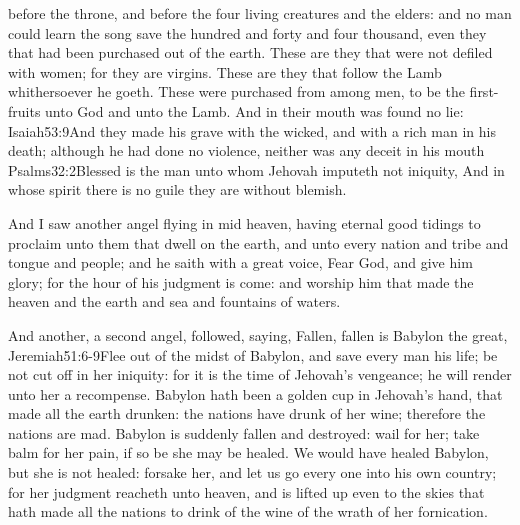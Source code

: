  before the throne, and before the four living creatures and the elders: and no man could learn the song save the hundred and forty and four thousand, even they that had been purchased out of the earth. 
 These are they that were not defiled with women; for they are virgins. These are they that follow the Lamb whithersoever he goeth. These were purchased from among men, to be the first-fruits unto God and unto the Lamb. 
 And in their mouth was found no lie:%
				   {Isaiah}{53:9}{And they made his grave with the wicked, and with a rich man in his death; although he had done no violence, neither was any deceit in his mouth}%
				   {Psalms}{32:2}{Blessed is the man unto whom Jehovah imputeth not iniquity,
And in whose spirit there is no guile}
 they are without blemish.

 And I saw another angel flying in mid heaven, having eternal good tidings to proclaim unto them that dwell on the earth, and unto every nation and tribe and tongue and people; 
 and he saith with a great voice, Fear God, and give him glory; for the hour of his judgment is come: and worship him that made the heaven and the earth and sea and fountains of waters.

 And another, a second angel, followed, saying, Fallen, fallen is Babylon the great,%
				  {Jeremiah}{51:6-9}{Flee out of the midst of Babylon, and save every man his life; be not cut off in her iniquity: for it is the time of Jehovah’s vengeance; he will render unto her a recompense. Babylon hath been a golden cup in Jehovah’s hand, that made all the earth drunken: the nations have drunk of her wine; therefore the nations are mad. Babylon is suddenly fallen and destroyed: wail for her; take balm for her pain, if so be she may be healed. We would have healed Babylon, but she is not healed: forsake her, and let us go every one into his own country; for her judgment reacheth unto heaven, and is lifted up even to the skies}
 that hath made all the nations to drink of the wine of the wrath of her fornication.

